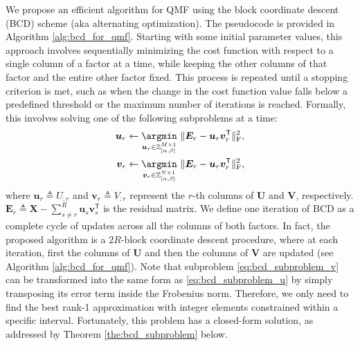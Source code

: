 We propose an efficient algorithm for QMF using the block coordinate descent (BCD) scheme (aka alternating optimization).
The pseudocode is provided in Algorithm \ref{alg:bcd_for_qmf}.
Starting with some initial parameter values, this approach involves sequentially minimizing the cost function with respect to a single column of a factor at a time, while keeping the other columns of that factor and the entire other factor fixed. This process is repeated until a stopping criterion is met, such as when the change in the cost function value falls below a predefined threshold or the maximum number of iterations is reached. Formally, this involves solving one of the following subproblems at a time:
\begin{align}
    \bm{u}_r \gets \underset{\bm{u}_r \in \mathbb{Z}_{[\alpha,\beta]}^{M \times 1}}{\argmin} \ \lVert \bm{E}_r - \bm{u}_r \bm{v}_r^\mathsf{T} \rVert_\text{F}^2, \label{eq:bcd_subproblem_u} \\
    \bm{v}_r \gets \underset{\bm{v}_r \in \mathbb{Z}_{[\alpha,\beta]}^{N \times 1}}{\argmin} \ \lVert \bm{E}_r - \bm{u}_r \bm{v}_r^\mathsf{T} \rVert_\text{F}^2, \label{eq:bcd_subproblem_v}
\end{align}
where $\bm{u}_r \triangleq U_{:r}$ and $\bm{v}_r \triangleq V_{:r}$ represent the $r$-th columns of $\bm{U}$ and $\bm{V}$, respectively. $\bm{E}_r \triangleq \bm{X} - \sum_{s \neq r}^{R} \bm{u}_s \bm{v}_s^\mathsf{T}$ is the residual matrix. We define one iteration of BCD as a complete cycle of updates across all the columns of both factors. In fact, the proposed algorithm is a $2R$-block coordinate descent procedure, where at each iteration, first the columns of $\bm{U}$ and then the columns of $\bm{V}$ are updated (see Algorithm \ref{alg:bcd_for_qmf}). Note that subproblem \eqref{eq:bcd_subproblem_v} can be transformed into the same form as \eqref{eq:bcd_subproblem_u} by simply transposing its error term inside the Frobenius norm. Therefore, we only need to find the best rank-1 approximation with integer elements constrained within a specific interval. Fortunately, this problem has a closed-form solution, as addressed by Theorem \ref{the:bcd_subproblem} below.

